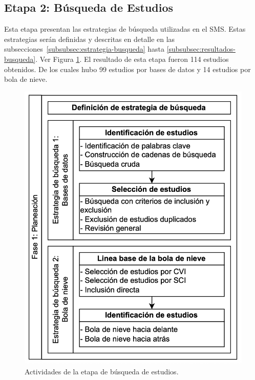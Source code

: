 \newcommand{\totalStudies}{114}
\newcommand{\databaseStudies}{99}
\newcommand{\snowballStudies}{14}
\newcommand{\directInclusionStudies}{0}



\subsection{Etapa 2: Búsqueda de Estudios}

Esta etapa presentan las estrategias de búsqueda utilizadas en el SMS. Estas estrategias serán definidas y descritas en detalle en las subsecciones~\ref{subsubsec:estrategia-busqueda} hasta \ref{subsubsec:resultados-busqueda}. Ver Figura \ref{fig:busqueda-estudios}.
El resultado de esta etapa fueron \totalStudies{} estudios obtenidos. De los cuales hubo \databaseStudies{} estudios por bases de datos y  \snowballStudies{} estudios por bola de nieve.


\begin{figure}[htbp]
	\centering
	\vspace{10pt}
	\includegraphics[scale=0.33]{resources/figures/fig03-fase1-planeacion.png}
	\caption{Actividades de la etapa de búsqueda de estudios.}
	\label{fig:busqueda-estudios}
\end{figure}


